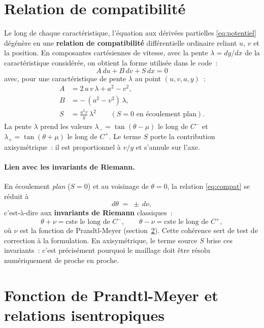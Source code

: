 \documentclass[11pt,a4paper]{article}
\begin{document}
\section{Relation de compatibilité}

Le long de chaque caractéristique, l'équation aux dérivées partielles
\eqref{eq:potentiel} dégénère en une \textbf{relation de compatibilité}
différentielle ordinaire reliant $u$, $v$ et la position. En composantes
cartésiennes de vitesse, avec la pente $\lambda = dy/dx$ de la caractéristique
considérée, on obtient la forme utilisée dans le code~:
\begin{equation}
  \boxed{\,A\,du + B\,dv + S\,dx = 0\,}
  \label{eq:compat}
\end{equation}
avec, pour une caractéristique de pente $\lambda$ au point $(u,v,a,y)$~:
\begin{align}
  A &= 2\,u\,v\,\lambda + a^2 - v^2, \\
  B &= -\,(a^2 - v^2)\,\lambda, \\
  S &= \frac{a^2 v}{y}\,\lambda^2 \qquad (S=0 \text{ en écoulement plan}).
  \label{eq:ABS}
\end{align}
La pente $\lambda$ prend les valeurs $\lambda_{-} = \tan(\theta-\mu)$ le long
de $C^{-}$ et $\lambda_{+} = \tan(\theta+\mu)$ le long de $C^{+}$. Le terme
$S$ porte la contribution axisymétrique~: il est proportionnel à $v/y$ et
s'annule sur l'axe.

\paragraph{Lien avec les invariants de Riemann.}
En écoulement \emph{plan} ($S=0$) et au voisinage de $\theta = 0$, la relation
\eqref{eq:compat} se réduit à
\begin{equation}
  d\theta \;=\; \pm\, d\nu,
\end{equation}
c'est-à-dire aux \textbf{invariants de Riemann} classiques~:
\begin{equation}
  \theta + \nu = \text{cste le long de } C^{-},
  \qquad
  \theta - \nu = \text{cste le long de } C^{+},
  \label{eq:riemann}
\end{equation}
où $\nu$ est la fonction de Prandtl-Meyer (section~\ref{sec:pm}). Cette
cohérence sert de test de correction à la formulation. En axisymétrique, le
terme source $S$ brise ces invariants~: c'est précisément pourquoi le maillage
doit être résolu numériquement de proche en proche.

\section{Fonction de Prandtl-Meyer et relations isentropiques}
\label{sec:pm}
\end{document}
